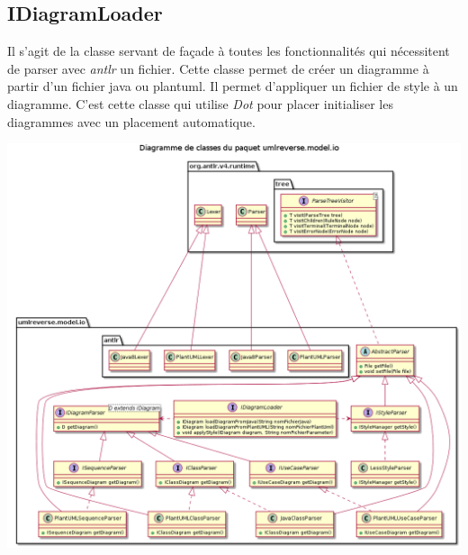\documentclass[a4paper,10pt]{article}
\begin{document}
    
    \subsection{IDiagramLoader}
   Il s'agit de la classe servant de façade à toutes les fonctionnalités qui nécessitent de parser avec \emph{antlr} un fichier.
   Cette classe permet de créer un diagramme à partir d'un fichier java ou plantuml. 
   Il permet d'appliquer un fichier de style à un diagramme.
   C'est cette classe qui utilise \emph{Dot} pour placer initialiser les diagrammes avec un placement automatique.
   \begin{center}
	  \includegraphics[width=14cm]{Image/parser.png}
	\end{center}
	
   \newpage
\end{document}
